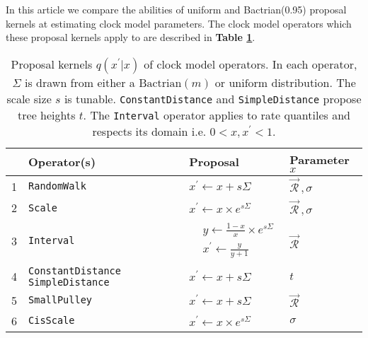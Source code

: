 \documentclass[10pt,letterpaper]{article}
\begin{document}
In this article we compare the abilities of uniform and Bactrian(0.95) proposal kernels at estimating clock model parameters. 
The clock model operators which these proposal kernels apply to are described in \textbf{Table \ref{table:bactriankernels}}.





\begin{table}[h!]
\centering
\begin{tabular}{l p{3cm} l l} 

 & Operator(s) & Proposal & Parameter $x$   \\
   \hline
 1 & \texttt{RandomWalk}  & $x^\prime \leftarrow x + s\Sigma$ & $\vec{\mathcal{R}}^{\,}, \sigma$  \\
  \hline
 2 & \texttt{Scale} & $x^\prime \leftarrow x \times e^{s\Sigma}$ & $\vec{\mathcal{R}}^{\,}, \sigma$   \\
  \hline
 3 & \texttt{Interval} & $\begin{array} {rl} &y \leftarrow \frac{1 - x}{x} \times e^{s\Sigma} \\ &x^\prime \leftarrow \frac{y}{y + 1}  \end{array}$ & $\vec{\mathcal{R}}^{\,}$  \\
  \hline
 4 & \texttt{ConstantDistance} \texttt{SimpleDistance} & $x^\prime \leftarrow x + s\Sigma$ & $t$ \\
 \hline
 5 & \texttt{SmallPulley} & $x^\prime \leftarrow x + s\Sigma$ & $\vec{\mathcal{R}}^{\,}$  \\
 \hline
6 & \texttt{CisScale}  & $x^\prime \leftarrow x \times e^{s\Sigma}$ & $\sigma$   \\
\end{tabular}
\caption{Proposal kernels $q(x^\prime|x)$ of clock model operators.
 In each operator, $\Sigma$ is drawn from either a $\text{Bactrian}(m)$ or $\text{uniform}$ distribution.  %
 The scale size $s$ is tunable.
 \texttt{ConstantDistance} and \texttt{SimpleDistance} propose tree heights $t$.
  The \texttt{Interval} operator applies to rate quantiles and respects its domain i.e. $0 < x, x^\prime < 1$. }
\label{table:bactriankernels}
\end{table}




\end{document}
